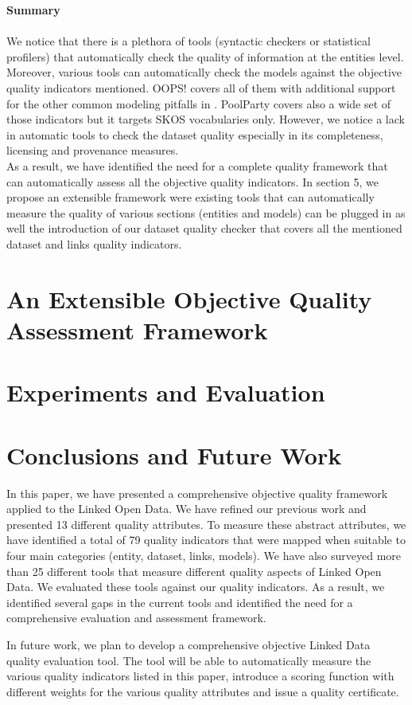 \documentclass[onecolumn, crcready]{iosart2c}
\begin{document}
\noindent

\textbf{Summary}
\indent \\\\
\indent We notice that there is a plethora of tools (syntactic checkers or statistical profilers) that automatically check the quality of information at the entities level. Moreover, various tools can automatically check the models against the objective quality indicators mentioned. OOPS! covers all of them with additional support for the other common modeling pitfalls in \cite{DBLP:conf/ic3k/KeetSP13}. PoolParty covers also a wide set of those indicators but it targets SKOS vocabularies only. However, we notice a lack in automatic tools to check the dataset quality especially in its completeness, licensing and provenance measures.\\
As a result, we have identified the need for a complete quality framework that can automatically assess all the objective quality indicators. In section 5, we propose an extensible framework were existing tools that can automatically measure the quality of various sections (entities and models) can be plugged in as well the introduction of our dataset quality checker that covers all the mentioned dataset and links quality indicators.

\section{An Extensible Objective Quality Assessment Framework}

\section{Experiments and Evaluation}

\section{Conclusions and Future Work}

In this paper, we have presented a comprehensive objective quality framework applied to the Linked Open Data. We have refined our previous work and presented 13 different quality attributes. To measure these abstract attributes, we have identified a total of 79 quality indicators that were mapped when suitable to four main categories (entity, dataset, links, models).
We have also surveyed more than 25 different tools that measure different quality aspects of Linked Open Data. We evaluated these tools against our quality indicators. As a result, we identified several gaps in the current tools and identified the need for a comprehensive evaluation and assessment framework.

In future work, we plan to develop a comprehensive objective Linked Data quality evaluation tool. The tool will be able to automatically measure the various quality indicators listed in this paper, introduce a scoring function with different weights for the various quality attributes and issue a quality certificate.



\end{document}
